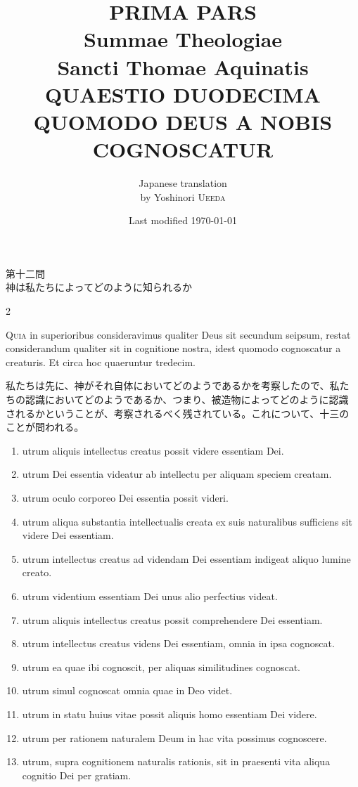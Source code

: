 \documentclass[paper=a4paper,fontsize=10pt,jafontsize=9pt,titlepage]{jlreq}
\title{{\bfseries PRIMA PARS}\\{\Huge Summae Theologiae}\\Sancti Thomae
Aquinatis\\{\sffamily QUAESTIO DUODECIMA}\\QUOMODO DEUS A NOBIS COGNOSCATUR}
\author{Japanese translation\\by Yoshinori {\scshape Ueeda}}
\date{Last modified \today}
\begin{document}
\maketitle

\begin{center}
{\Large 第十二問\\
神は私たちによってどのように知られるか}
\end{center}

\begin{paracol}{2}

{\scshape \Large Quia} in superioribus consideravimus qualiter Deus sit secundum seipsum,
 restat considerandum qualiter sit in cognitione nostra, idest quomodo
 cognoscatur a creaturis. Et circa hoc quaeruntur tredecim.

\switchcolumn

私たちは先に、神がそれ自体においてどのようであるかを考察したので、私た
ちの認識においてどのようであるか、つまり、被造物によってどのように認識
されるかということが、考察されるべく残されている。これについて、十三の
ことが問われる。

\switchcolumn*

\begin{enumerate}
 \item  utrum aliquis intellectus creatus possit videre essentiam
	Dei. 
 \item utrum Dei essentia videatur ab intellectu per aliquam
       speciem creatam.
 \item utrum oculo corporeo Dei essentia possit videri.
 \item utrum aliqua substantia intellectualis creata ex suis
	naturalibus sufficiens sit videre Dei essentiam. 
 \item utrum intellectus creatus ad videndam Dei essentiam
       indigeat aliquo lumine creato. 
 \item utrum videntium essentiam Dei unus alio perfectius
       videat. 
 \item utrum aliquis intellectus creatus possit comprehendere
       Dei essentiam. 
 \item utrum intellectus creatus videns Dei essentiam, omnia in
       ipsa cognoscat. 
 \item utrum ea quae ibi cognoscit, per aliquas similitudines
       cognoscat. 
 \item utrum simul cognoscat omnia quae in Deo videt. 
 \item utrum in statu huius vitae possit aliquis homo essentiam Dei
       videre. 
 \item utrum per rationem naturalem Deum in hac vita possimus
       cognoscere. 
 \item utrum, supra cognitionem naturalis rationis, sit in
       praesenti vita aliqua cognitio Dei per gratiam.


\end{enumerate}
\end{paracol}
\end{document}
